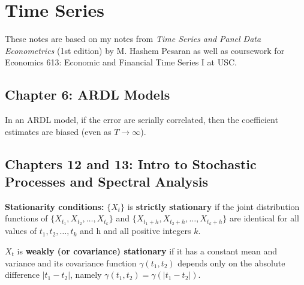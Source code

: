 %
%
%
%
%
%
%
%
%
%
%
%
%

\section{Time Series}

These notes are based on my notes from \textit{Time Series and Panel Data Econometrics} (1st edition) by M. Hashem Pesaran as well as coursework for Economics 613: Economic and Financial Time Series I at USC.

\subsection{Chapter 6: ARDL Models}

In an ARDL model, if the error are serially correlated, then the coefficient estimates are biased (even as \(T \to \infty\)).


\subsection{Chapters 12 and 13: Intro to Stochastic Processes and Spectral Analysis}

\textbf{Stationarity conditions:} \( \{X_t\} \) is \textbf{strictly stationary} if the joint distribution functions of \( \{ X_{t_1}, X_{t_2}, \ldots, X_{t_k}\} \) and \( \{ X_{t_1+h}, X_{t_2+h}, \ldots, X_{t_k+h}\} \) are identical for all values of \(t_1,  t_2, \ldots, t_k\) and h and all positive integers \(k\). 

\begin{definition}\label{tf.def.cov.stationary} \(X_t\) is \textbf{weakly (or covariance) stationary} if it has a constant mean and variance and its covariance function \(\gamma(t_1, t_2)\) depends only on the absolute difference \(| t_1 - t_2|\), namely \(\gamma(t_1, t_2) = \gamma(|t_1 - t_2|)\).
\end{definition}

